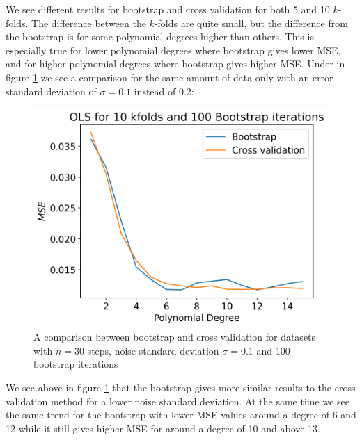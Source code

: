 \documentclass[12pt]{article}
\begin{document}
We see different results for bootstrap and cross validation for both 5 and 10 $k$-folds. The difference between the $k$-folds are quite small, but the difference from the bootstrap is for some polynomial degrees higher than others. This is especially true for lower polynomial degrees where bootstrap gives lower MSE, and for higher polynomial degrees where bootstrap gives higher MSE. Under in figure \ref{fig:cv_comp_01} we see a comparison for the same amount of data only with an error standard deviation of $\sigma=0.1$ instead of 0.2:
\begin{figure}[H]
  \centering
  \includegraphics[width=.7\textwidth]{../figures/boot_cv_comp_01.png}
  \caption{A comparison between bootstrap and cross validation for datasets with $n=30$ steps, noise standard deviation $\sigma=0.1$ and 100 bootstrap iterations}
  \label{fig:cv_comp_01}
\end{figure}
We see above in figure \ref{fig:cv_comp_01} that the bootstrap gives more similar results to the cross validation method for a lower noise standard deviation. At the same time we see the same trend for the bootstrap with lower MSE values around a degree of 6 and 12 while it still gives higher MSE for around a degree of 10 and above 13.
\end{document}
